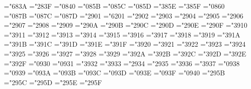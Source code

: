 \mathchardef\bfldotp="683A
\def\bfldots{\mathinner{\bfldotp\bfldotp\bfldotp}}
\let\bfdots=\bfldots
\mathchardef\bfstar="283F
\mathchardef\bfpartial="0840
\mathchardef\bfflat="085B
\mathchardef\bfnatural="085C
\mathchardef\bfsharp="085D
\mathchardef\bfsmile="385E
\mathchardef\bffrown="385F
\mathchardef\bfell="0860
\mathchardef\bfimath="087B
\mathchardef\bfjmath="087C
\mathchardef\bfwp="087D
\mathchardef\bfcdot="2901
\mathchardef\bfcdotp="6201
\def\bfcdots{\mathinner{\bfcdotp\bfcdotp\bfcdotp}}
\mathchardef\bftimes="2902
\mathchardef\bfast="2903
\mathchardef\bfdiv="2904
\mathchardef\bfdiamond="2905
\mathchardef\bfpm="2906
\mathchardef\bfmp="2907
\mathchardef\bfoplus="2908
\mathchardef\bfominus="2909
\mathchardef\bfotimes="290A
\mathchardef\bfoslash="290B
\mathchardef\bfodot="290C
\mathchardef\bfbigcirc="290D
\mathchardef\bfcirc="290E
\mathchardef\bfbullet="290F
\mathchardef\bfasymp="3910
\mathchardef\bfequiv="3911
\mathchardef\bfsubseteq="3912
\mathchardef\bfsupseteq="3913
\mathchardef\bfleq="3914 \let\bfle=\bfleq
\mathchardef\bfgeq="3915 \let\bfge=\bfgeq
\mathchardef\bfpreceq="3916
\mathchardef\bfsucceq="3917
\mathchardef\bfsim="3918
\mathchardef\bfapprox="3919
\mathchardef\bfsubset="391A
\mathchardef\bfsupset="391B
\mathchardef\bfll="391C
\mathchardef\bfgg="391D
\mathchardef\bfprec="391E
\mathchardef\bfsucc="391F
\mathchardef\bfleftarrow="3920 \let\bfgets=\bfleftarrow
\mathchardef\bfrightarrow="3921 \let\bfto=\bfrightarrow
\mathchardef\bfuparrow="3922
\mathchardef\bfdownarrow="3923
\mathchardef\bfleftrightarrow="3924
\mathchardef\bfnearrow="3925
\mathchardef\bfsearrow="3926
\mathchardef\bfsimeq="3927
\mathchardef\bfLeftarrow="3928
\mathchardef\bfRightarrow="3929
\mathchardef\bfUparrow="392A
\mathchardef\bfDownarrow="392B
\mathchardef\bfLeftrightarrow="392C
\mathchardef\bfnwarrow="392D
\mathchardef\bfswarrow="392E
\mathchardef\bfpropto="392F
\mathchardef\bfprime="0930
\mathchardef\bfinfty="0931
\mathchardef\bfin="3932
\mathchardef\bfni="3933
\mathchardef\bfbigtriangle="2934
\mathchardef\bfbigtriangledown="2935
\mathchardef\bfnot="3936
\mathchardef\bfmapstochar="3937
\def\bfmapsto{\bfmapstochar\bfrightarrow}
\mathchardef\bfforall="0938
\mathchardef\bfexists="0939
\mathchardef\bfneg="093A \let\bflnot=\bfneg
\mathchardef\bfemptyset="093B
\mathchardef\bfRe="093C
\mathchardef\bfIm="093D
\mathchardef\bftop="093E
\mathchardef\bfbot="093F \let\bfperp=\bfbot
\mathchardef\bfaleph="0940
\mathchardef\bfcup="295B
\mathchardef\bfcap="295C
\mathchardef\bfuplus="295D
\mathchardef\bfwedge="295E \let\bfland=\bfwedge
\mathchardef\bfvee="295F \let\bflor=\bfvee
